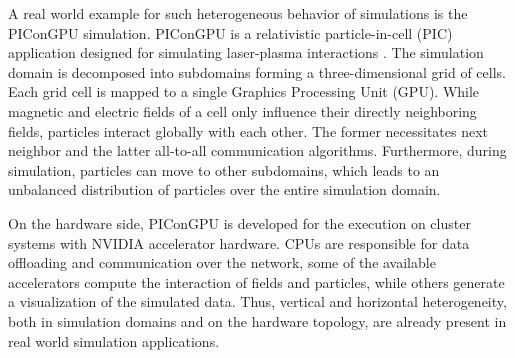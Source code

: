 

\noindent A real world example for such heterogeneous behavior of simulations is
the PIConGPU simulation. PIConGPU is a relativistic particle-in-cell
(PIC) application designed for simulating laser-plasma interactions
\cite{ref:picongpu}. The simulation domain is decomposed into
subdomains forming a three-dimensional grid of cells. Each grid cell
is mapped to a single Graphics Processing Unit (GPU).  While
magnetic and electric fields of a cell only influence their directly
neighboring fields, particles interact globally with each other. The
former necessitates next neighbor and the latter all-to-all
communication algorithms. Furthermore, during simulation, particles
can move to other subdomains, which leads to an unbalanced
distribution of particles over the entire simulation domain.

On the hardware side, PIConGPU is developed for the execution on
cluster systems with NVIDIA accelerator hardware.  CPUs are
responsible for data offloading and communication over the network,
some of the available accelerators compute the interaction of fields
and particles, while others generate a visualization of the simulated
data. Thus, vertical and horizontal heterogeneity, both in simulation
domains and on the hardware topology, are already present in real world
simulation applications.

